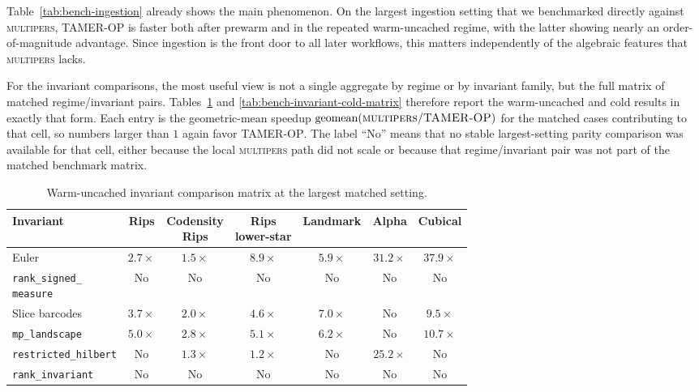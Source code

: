 \documentclass[11pt]{article}
\newcommand{\TAMER}{\textsc{TAMER-OP}}
\newcommand{\multipers}{\textsc{multipers}}
\theoremstyle{definition}
\theoremstyle{remark}
\begin{document}
Table~\ref{tab:bench-ingestion} already shows the main phenomenon.  On the largest ingestion setting that we benchmarked directly against \multipers{}, \TAMER{} is faster both after prewarm and in the repeated warm-uncached regime, with the latter showing nearly an order-of-magnitude advantage.  Since ingestion is the front door to all later workflows, this matters independently of the algebraic features that \multipers{} lacks.

For the invariant comparisons, the most useful view is not a single aggregate by regime or by invariant family, but the full matrix of matched regime/invariant pairs.  Tables~\ref{tab:bench-invariant-warm-matrix} and \ref{tab:bench-invariant-cold-matrix} therefore report the warm-uncached and cold results in exactly that form.  Each entry is the geometric-mean speedup \(\mathrm{geomean}(\text{\multipers{}}/\text{\TAMER{}})\) for the matched cases contributing to that cell, so numbers larger than \(1\) again favor \TAMER{}.  The label ``No'' means that no stable largest-setting parity comparison was available for that cell, either because the local \multipers{} path did not scale or because that regime/invariant pair was not part of the matched benchmark matrix.

\begin{table}[t]
\centering
\scriptsize
\setlength{\tabcolsep}{5pt}
\begin{tabular}{|l|c|c|c|c|c|c|}
\hline
Invariant & Rips & \shortstack{Codensity\\Rips} & \shortstack{Rips\\lower-star} & Landmark & Alpha & Cubical \\
\hline
Euler & \(2.7\times\) & \(1.5\times\) & \(8.9\times\) & \(5.9\times\) & \(31.2\times\) & \(37.9\times\) \\
\shortstack[l]{\texttt{rank\_signed\_}\\\texttt{measure}} & No & No & No & No & No & No \\
Slice barcodes & \(3.7\times\) & \(2.0\times\) & \(4.6\times\) & \(7.0\times\) & No & \(9.5\times\) \\
\texttt{mp\_landscape} & \(5.0\times\) & \(2.8\times\) & \(5.1\times\) & \(6.2\times\) & No & \(10.7\times\) \\
\texttt{restricted\_hilbert} & No & \(1.3\times\) & \(1.2\times\) & No & \(25.2\times\) & No \\
\texttt{rank\_invariant} & No & No & No & No & No & No \\
\hline
\end{tabular}
\caption{Warm-uncached invariant comparison matrix at the largest matched setting.}
\label{tab:bench-invariant-warm-matrix}
\end{table}
\end{document}

